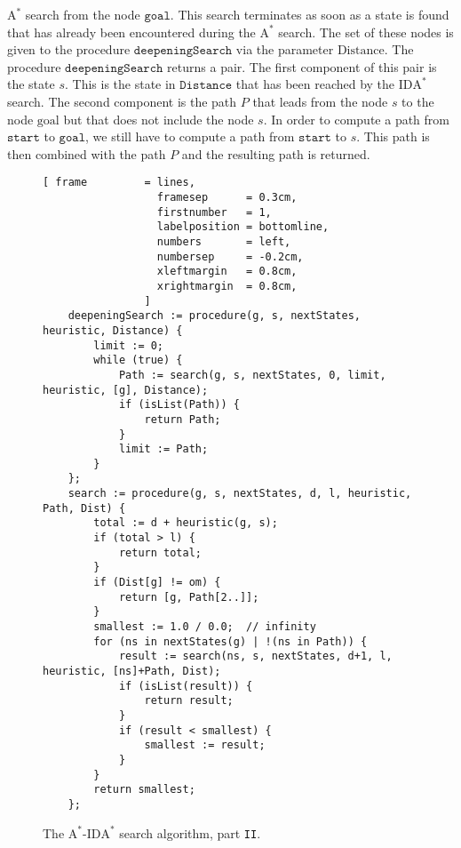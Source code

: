 \begin{enumerate}
      $\mathrm{A}^*$ search from the node $\mathtt{goal}$.  This search terminates as soon as a state is found
      that has already been encountered during the $\mathrm{A}^*$ search.  The set of these nodes is given to
      the procedure $\mathtt{deepeningSearch}$ via the parameter $\mathrm{Distance}$.  The procedure
      $\mathtt{deepeningSearch}$ returns a pair.  The first component of this pair is the state $s$.  This is
      the state in $\mathtt{Distance}$ that has been reached by the $\mathrm{IDA}^*$ search.  The second component is the
      path $P$ that leads from the node $s$ to the node $\mathrm{goal}$ but that does not include the node $s$.
      In order to compute a path from $\mathtt{start}$ to $\mathtt{goal}$, we still have to compute a
      path from $\mathtt{start}$ to $s$.  This path is then combined with the path $P$ and the resulting path
      is returned.
\end{enumerate}


\begin{figure}[!ht]
\centering
\begin{Verbatim}[ frame         = lines, 
                  framesep      = 0.3cm, 
                  firstnumber   = 1,
                  labelposition = bottomline,
                  numbers       = left,
                  numbersep     = -0.2cm,
                  xleftmargin   = 0.8cm,
                  xrightmargin  = 0.8cm,
                ]
    deepeningSearch := procedure(g, s, nextStates, heuristic, Distance) {
        limit := 0;
        while (true) {
            Path := search(g, s, nextStates, 0, limit, heuristic, [g], Distance);
            if (isList(Path)) {
                return Path;
            }
            limit := Path;
        }
    };
    search := procedure(g, s, nextStates, d, l, heuristic, Path, Dist) {
        total := d + heuristic(g, s);
        if (total > l) {
            return total;
        }
        if (Dist[g] != om) {
            return [g, Path[2..]];
        }
        smallest := 1.0 / 0.0;  // infinity
        for (ns in nextStates(g) | !(ns in Path)) {
            result := search(ns, s, nextStates, d+1, l, heuristic, [ns]+Path, Dist);
            if (isList(result)) {
                return result;
            }
            if (result < smallest) {
                smallest := result;
            }
        }
        return smallest;
    };
\end{Verbatim}
\vspace*{-0.3cm}
\caption{The $\mathrm{A}^*$-$\mathrm{IDA}^*$ search algorithm, part \texttt{II}.}
\label{fig:a-star-ida-star.stlx-2}
\end{figure}

